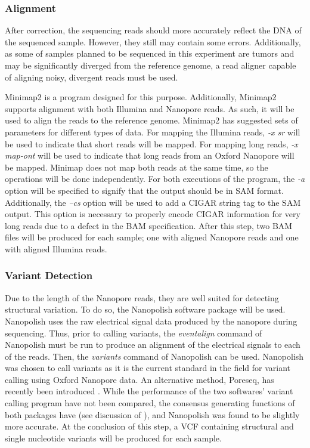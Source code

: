 \subsubsection{Alignment}

After correction, the sequencing reads should more accurately reflect the DNA of the sequenced sample. However, they still may contain some errors. Additionally, as some of samples planned to be sequenced in this experiment are tumors and may be significantly diverged from the reference genome, a read aligner capable of aligning noisy, divergent reads must be used.

Minimap2 is a program designed for this purpose. Additionally, Minimap2 supports alignment with both Illumina and Nanopore reads. As such, it will be used to align the reads to the reference genome.
Minimap2 has suggested sets of parameters for different types of data. For mapping the Illumina reads, \textit{-x sr} will be used to indicate that short reads will be mapped. For mapping long reads, \textit{-x map-ont} will be used to indicate that long reads from an Oxford Nanopore will be mapped. Minimap does not map both reads at the same time, so the operations will be done independently. For both executions of the program, the \textit{-a} option will be specified to signify that the output should be in SAM format. Additionally, the \textit{--cs} option will be used to add a CIGAR string tag to the SAM output. This option is necessary to properly encode CIGAR information for very long reads due to a defect in the BAM specification. After this step, two BAM files will be produced for each sample; one with aligned Nanopore reads and one with aligned Illumina reads.

\subsubsection{Variant Detection}

Due to the length of the Nanopore reads, they are well suited for detecting structural variation. To do so, the Nanopolish software package will be used. Nanopolish uses the raw electrical signal data produced by the nanopore during sequencing. Thus, prior to calling variants, the \textit{eventalign} command of Nanopolish must be run to produce an alignment of the electrical signals to each of the reads. Then, the \textit{variants} command of Nanopolish can be used. Nanopolish was chosen to call variants as it is the current standard in the field for variant calling using Oxford Nanopore data. An alternative method, Poreseq, has recently been introduced \parencite{szalay_novo_2015}. While the performance of the two softwares' variant calling program have not been compared, the consensus generating functions of both packages have (see discussion of \cite{szalay_novo_2015}), and Nanopolish was found to be slightly more accurate. At the conclusion of this step, a VCF containing structural and single nucleotide variants will be produced for each sample.

